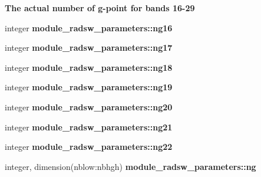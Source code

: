 \begin{Indent}\textbf{ The actual number of g-\/point for bands 16-\/29}\par
\begin{DoxyCompactItemize}
\item 
\mbox{\label{namespacemodule__radsw__parameters_a442b3758f00a388cd8b7129ba910942a}} 
integer {\bfseries module\+\_\+radsw\+\_\+parameters\+::ng16}
\item 
\mbox{\label{namespacemodule__radsw__parameters_af1f90ffe5780463d1e2edbe0e8dfd1f9}} 
integer {\bfseries module\+\_\+radsw\+\_\+parameters\+::ng17}
\item 
\mbox{\label{namespacemodule__radsw__parameters_ac00a8e59e4f7e584af9b453c2c9fe35d}} 
integer {\bfseries module\+\_\+radsw\+\_\+parameters\+::ng18}
\item 
\mbox{\label{namespacemodule__radsw__parameters_ab3551e23105cd3515e887e877407dc39}} 
integer {\bfseries module\+\_\+radsw\+\_\+parameters\+::ng19}
\item 
\mbox{\label{namespacemodule__radsw__parameters_a1619a2243f1cb29e4393598fa0bc4c8f}} 
integer {\bfseries module\+\_\+radsw\+\_\+parameters\+::ng20}
\item 
\mbox{\label{namespacemodule__radsw__parameters_ab029caf0ee0c1195539643bef00e0598}} 
integer {\bfseries module\+\_\+radsw\+\_\+parameters\+::ng21}
\item 
\mbox{\label{namespacemodule__radsw__parameters_a655c1f742fc97d58c32131e8a85cb6fd}} 
integer {\bfseries module\+\_\+radsw\+\_\+parameters\+::ng22}
\item 
\mbox{\label{namespacemodule__radsw__parameters_aff9670cd3f5bef92ca998e491e28986e}} 
integer, dimension(nblow\+:nbhgh) {\bfseries module\+\_\+radsw\+\_\+parameters\+::ng}
\end{DoxyCompactItemize}
\end{Indent}
